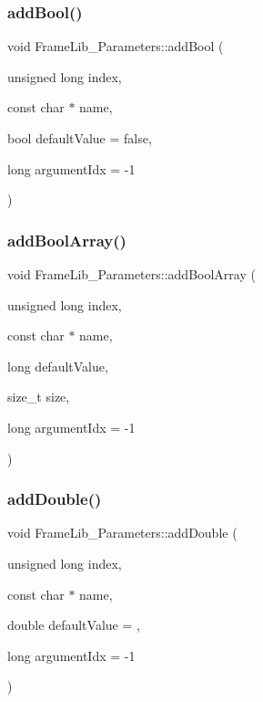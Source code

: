 \subsubsection{\texorpdfstring{add\+Bool()}{addBool()}}
{\footnotesize\ttfamily void Frame\+Lib\+\_\+\+Parameters\+::add\+Bool (\begin{DoxyParamCaption}\item[{unsigned long}]{index,  }\item[{const char $\ast$}]{name,  }\item[{bool}]{default\+Value = {\ttfamily false},  }\item[{long}]{argument\+Idx = {\ttfamily -\/1} }\end{DoxyParamCaption})\hspace{0.3cm}{\ttfamily [inline]}}

\mbox{\label{class_frame_lib___parameters_a9239184fd366b1cbaeec545577c20ab2}} 
\subsubsection{\texorpdfstring{add\+Bool\+Array()}{addBoolArray()}}
{\footnotesize\ttfamily void Frame\+Lib\+\_\+\+Parameters\+::add\+Bool\+Array (\begin{DoxyParamCaption}\item[{unsigned long}]{index,  }\item[{const char $\ast$}]{name,  }\item[{long}]{default\+Value,  }\item[{size\+\_\+t}]{size,  }\item[{long}]{argument\+Idx = {\ttfamily -\/1} }\end{DoxyParamCaption})\hspace{0.3cm}{\ttfamily [inline]}}

\mbox{\label{class_frame_lib___parameters_ab05bf4cd30eecd26bba972efd171798c}} 
\subsubsection{\texorpdfstring{add\+Double()}{addDouble()}}
{\footnotesize\ttfamily void Frame\+Lib\+\_\+\+Parameters\+::add\+Double (\begin{DoxyParamCaption}\item[{unsigned long}]{index,  }\item[{const char $\ast$}]{name,  }\item[{double}]{default\+Value = {},  }\item[{long}]{argument\+Idx = {\ttfamily -\/1} }\end{DoxyParamCaption})\hspace{0.3cm}{\ttfamily [inline]}}


